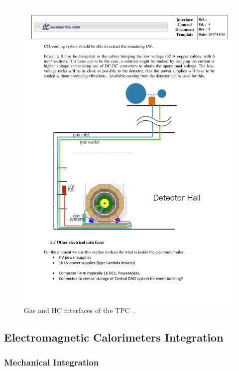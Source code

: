 \begin{figure}[h!]
    \centering
    \includegraphics[width=1.0\hsize]{Integration/fig/TPC_Interfaces.pdf}
    \caption{Gas and HC interfaces of the TPC~\cite{ild:bib:TPC_ICD}.}
    \label{ILD:fig:tpc_interfaces}
\end{figure}


\subsection{Electromagnetic Calorimeters Integration}

\subsubsection{Mechanical Integration}

